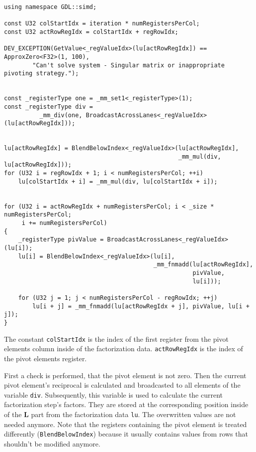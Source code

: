 \begin{verbatim}
using namespace GDL::simd;

const U32 colStartIdx = iteration * numRegistersPerCol;
const U32 actRowRegIdx = colStartIdx + regRowIdx;

DEV_EXCEPTION(GetValue<_regValueIdx>(lu[actRowRegIdx]) == ApproxZero<F32>(1, 100),
        "Can't solve system - Singular matrix or inappropriate pivoting strategy.");


const _registerType one = _mm_set1<_registerType>(1);
const _registerType div = 
          _mm_div(one, BroadcastAcrossLanes<_regValueIdx>(lu[actRowRegIdx]));


lu[actRowRegIdx] = BlendBelowIndex<_regValueIdx>(lu[actRowRegIdx],
                                                 _mm_mul(div, lu[actRowRegIdx]));
for (U32 i = regRowIdx + 1; i < numRegistersPerCol; ++i)
    lu[colStartIdx + i] = _mm_mul(div, lu[colStartIdx + i]);


for (U32 i = actRowRegIdx + numRegistersPerCol; i < _size * numRegistersPerCol;
     i += numRegistersPerCol)
{
    _registerType pivValue = BroadcastAcrossLanes<_regValueIdx>(lu[i]);
    lu[i] = BlendBelowIndex<_regValueIdx>(lu[i], 
                                          _mm_fnmadd(lu[actRowRegIdx], 
                                                     pivValue, 
                                                     lu[i]));
    
    for (U32 j = 1; j < numRegistersPerCol - regRowIdx; ++j)
        lu[i + j] = _mm_fnmadd(lu[actRowRegIdx + j], pivValue, lu[i + j]);
}
\end{verbatim}

The constant \texttt{colStartIdx} is the index of the first register from the pivot elements column inside of the factorization data.
\texttt{actRowRegIdx} is the index of the pivot elements register.
 

First a check is performed, that the pivot element is not zero.
Then the current pivot element's reciprocal is calculated and broadcasted to all elements of the variable \texttt{div}.
Subsequently, this variable is used to calculate the current factorization step's factors.
They are stored at the corresponding position inside of the $\mathbf{L}$ part from the factorization data \texttt{lu}.
The overwritten values are not needed anymore.
Note that the registers containing the pivot element is treated differently (\texttt{BlendBelowIndex}) because it usually contains values from rows that shouldn't be modified anymore.

